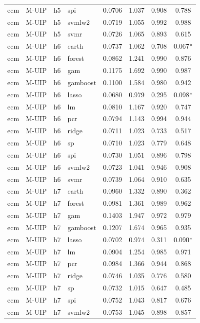 \begin{ThreePartTable}
\begin{longtable}[t]{llclcccc}
ecm & M-UIP & h5 & spi & 0.0706 & 1.037 & 0.908 & 0.788\\
ecm & M-UIP & h5 & svmlw2 & 0.0719 & 1.055 & 0.992 & 0.988\\
ecm & M-UIP & h5 & svmr & 0.0726 & 1.065 & 0.893 & 0.615\\
\addlinespace
ecm & M-UIP & h6 & earth & 0.0737 & 1.062 & 0.708 & 0.067*\\
ecm & M-UIP & h6 & forest & 0.0862 & 1.241 & 0.990 & 0.876\\
ecm & M-UIP & h6 & gam & 0.1175 & 1.692 & 0.990 & 0.987\\
ecm & M-UIP & h6 & gamboost & 0.1100 & 1.584 & 0.980 & 0.942\\
ecm & M-UIP & h6 & lasso & 0.0680 & 0.979 & 0.295 & 0.098*\\
ecm & M-UIP & h6 & lm & 0.0810 & 1.167 & 0.920 & 0.747\\
ecm & M-UIP & h6 & pcr & 0.0794 & 1.143 & 0.994 & 0.944\\
ecm & M-UIP & h6 & ridge & 0.0711 & 1.023 & 0.733 & 0.517\\
ecm & M-UIP & h6 & sp & 0.0710 & 1.023 & 0.779 & 0.648\\
ecm & M-UIP & h6 & spi & 0.0730 & 1.051 & 0.896 & 0.798\\
ecm & M-UIP & h6 & svmlw2 & 0.0723 & 1.041 & 0.946 & 0.908\\
ecm & M-UIP & h6 & svmr & 0.0739 & 1.064 & 0.910 & 0.635\\
\addlinespace
ecm & M-UIP & h7 & earth & 0.0960 & 1.332 & 0.890 & 0.362\\
ecm & M-UIP & h7 & forest & 0.0981 & 1.361 & 0.989 & 0.962\\
ecm & M-UIP & h7 & gam & 0.1403 & 1.947 & 0.972 & 0.979\\
ecm & M-UIP & h7 & gamboost & 0.1207 & 1.674 & 0.965 & 0.935\\
ecm & M-UIP & h7 & lasso & 0.0702 & 0.974 & 0.311 & 0.090*\\
ecm & M-UIP & h7 & lm & 0.0904 & 1.254 & 0.985 & 0.971\\
ecm & M-UIP & h7 & pcr & 0.0984 & 1.366 & 0.944 & 0.868\\
ecm & M-UIP & h7 & ridge & 0.0746 & 1.035 & 0.776 & 0.580\\
ecm & M-UIP & h7 & sp & 0.0732 & 1.015 & 0.647 & 0.485\\
ecm & M-UIP & h7 & spi & 0.0752 & 1.043 & 0.817 & 0.676\\
ecm & M-UIP & h7 & svmlw2 & 0.0753 & 1.045 & 0.898 & 0.857\\

\end{longtable}
\end{ThreePartTable}
